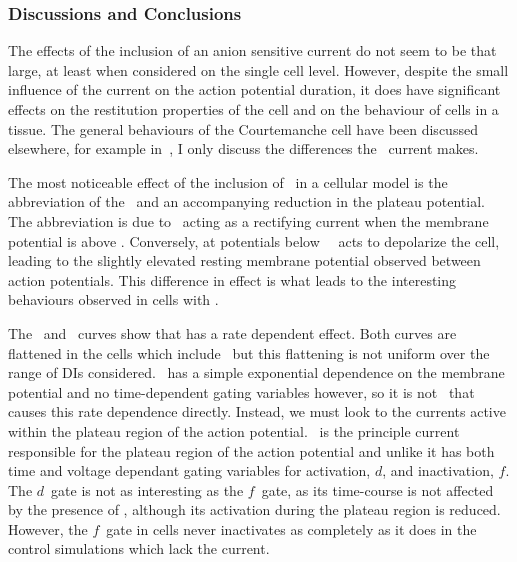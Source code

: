 \subsubsection{Discussions and Conclusions}

The effects of the inclusion of an anion sensitive current do not seem to be
that large, at least when considered on the single cell level.
However, despite the small influence of the current on the action potential duration,
it does have significant effects on the restitution properties of the cell and
on the behaviour of cells in a tissue.
The general behaviours of the Courtemanche cell have been discussed elsewhere,
for example in~\cite{CRN98,Cherry2008a}, I only discuss the differences the
\ current makes.

The most noticeable effect of the inclusion of \ in a cellular model
is the abbreviation of the \apd[50]\ and an accompanying reduction in the
plateau potential.  The abbreviation is due to \ acting as a
rectifying current when the membrane potential is above .   Conversely,
at potentials below \ \ acts to depolarize the cell, leading
to the slightly elevated resting membrane potential observed between action
potentials.  This difference in effect is what leads to the interesting
behaviours observed in cells with .

The \apdr[50]\ and \apdr\ curves show that  has a rate dependent
effect.  Both curves are flattened in the cells which include \, but
this flattening is not uniform over the range of DIs considered.
\ has a simple exponential dependence on the membrane potential and no
time-dependent gating variables however, so it is not \ that causes
this rate dependence directly.
Instead, we must look to the currents active within the plateau region of the
action potential.
\ is the principle current responsible for the plateau region of the
action potential and unlike  it has both time and voltage dependant
gating variables for activation, $d$, and inactivation, $f$.
The $d$\ gate is not as interesting as the $f$\ gate, as its time-course is not
affected by the presence of , although its activation during the
plateau region is reduced.
However, the $f$\ gate in  cells never inactivates as completely as
it does in the control simulations which lack the current.

